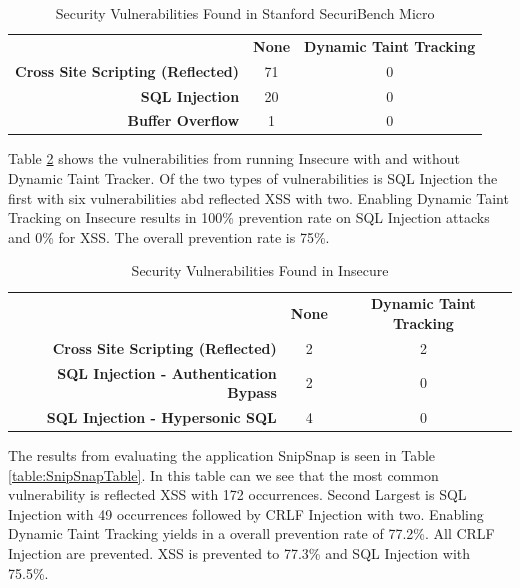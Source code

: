 \begin{table}[!hbt]
  \centering
  \caption{Security Vulnerabilities Found in Stanford SecuriBench Micro}
  \label{table:MicroTable}
    \begin{tabular}{rcc}
      & \textbf{None} & \textbf{Dynamic Taint Tracking} \\
      \textbf{Cross Site Scripting (Reflected)} & 71            & 0  \\
      \textbf{SQL Injection}                    & 20            & 0  \\
      \textbf{Buffer Overflow}                  & 1             & 0  
    \end{tabular}
\end{table}

Table \ref{table:InsecureTable} shows the vulnerabilities from running Insecure \parencite{insecure} with and without Dynamic Taint Tracker. Of the two types of vulnerabilities is SQL Injection the first with six vulnerabilities abd reflected XSS with two. Enabling Dynamic Taint Tracking on Insecure \parencite{insecure} results in 100\% prevention rate on SQL Injection attacks and 0\% for XSS. The overall prevention rate is 75\%. 

\begin{table}[!hbt]
  \centering
  \caption{Security Vulnerabilities Found in Insecure}
  \label{table:InsecureTable}
    \begin{tabular}{rcc}
      & \textbf{None} & \textbf{Dynamic Taint Tracking} \\
      \textbf{Cross Site Scripting (Reflected)}      & 2             & 2  \\
      \textbf{SQL Injection - Authentication Bypass} & 2             & 0  \\
      \textbf{SQL Injection - Hypersonic SQL}        & 4             & 0  
    \end{tabular}
\end{table}

The results from evaluating the application SnipSnap \parencite{snipsnap} is seen in Table \ref{table:SnipSnapTable}. In this table can we see that the most common vulnerability is reflected XSS with 172 occurrences. Second Largest is SQL Injection with 49 occurrences followed by CRLF Injection with two. Enabling Dynamic Taint Tracking yields in a overall prevention rate of 77.2\%. All CRLF Injection are prevented. XSS is prevented to 77.3\% and SQL Injection with 75.5\%.


